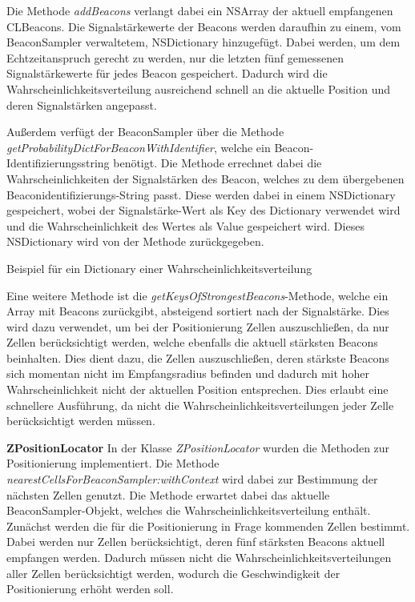 Die Methode \emph{addBeacons} verlangt dabei ein NSArray der aktuell empfangenen CLBeacons. Die Signalstärkewerte der Beacons werden daraufhin zu einem, vom BeaconSampler verwaltetem, NSDictionary hinzugefügt. Dabei werden, um dem Echtzeitanspruch gerecht zu werden, nur die letzten fünf gemessenen Signalstärkewerte für jedes Beacon gespeichert. Dadurch wird die Wahrscheinlichkeitsverteilung ausreichend schnell an die aktuelle Position und deren Signalstärken angepasst.

Außerdem verfügt der BeaconSampler über die Methode \emph{getProbabilityDictForBeaconWithIdentifier}, welche ein Beacon-Identifizierungsstring benötigt. Die Methode errechnet dabei die Wahrscheinlichkeiten der Signalstärken des Beacon, welches zu dem übergebenen Beaconidentifizierungs-String passt. Diese werden dabei in einem NSDictionary gespeichert, wobei der Signalstärke-Wert als Key des Dictionary verwendet wird und die Wahrscheinlichkeit des Wertes als Value gespeichert wird. Dieses NSDictionary wird von der Methode zurückgegeben.

\begin{listing}[htb!]
    \caption{Beispiel für ein Dictionary einer Wahrscheinlichkeitsverteilung}
	\label{lst:probablities}
\end{listing}

Eine weitere Methode ist die \emph{getKeysOfStrongestBeacons}-Methode, welche ein Array mit Beacons zurückgibt, absteigend sortiert nach der Signalstärke. Dies wird dazu verwendet, um bei der Positionierung Zellen auszuschließen, da nur Zellen berücksichtigt werden, welche ebenfalls die aktuell stärksten Beacons beinhalten. Dies dient dazu, die Zellen auszuschließen, deren stärkste Beacons sich momentan nicht im Empfangsradius befinden und dadurch mit hoher Wahrscheinlichkeit nicht der aktuellen Position entsprechen. Dies erlaubt eine schnellere Ausführung, da nicht die Wahrscheinlichkeitsverteilungen jeder Zelle berücksichtigt werden müssen.



\textbf{ZPositionLocator}
In der Klasse \emph{ZPositionLocator} wurden die Methoden zur Positionierung implementiert. Die Methode \emph{nearestCellsForBeaconSampler:withContext} wird dabei zur Bestimmung der nächsten Zellen genutzt. 
Die Methode erwartet dabei das aktuelle BeaconSampler-Objekt, welches die Wahrscheinlichkeitsverteilung enthält. 
Zunächst werden die für die Positionierung in Frage kommenden Zellen bestimmt. Dabei werden nur Zellen berücksichtigt, deren fünf stärksten Beacons aktuell empfangen werden. Dadurch müssen nicht die Wahrscheinlichkeitsverteilungen aller Zellen berücksichtigt werden, wodurch die Geschwindigkeit der Positionierung erhöht werden soll.

